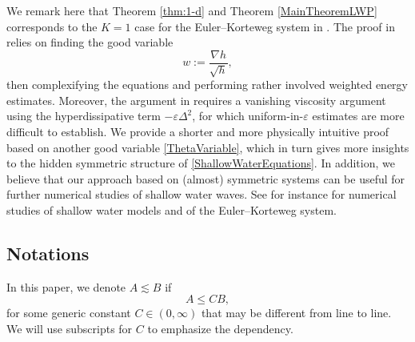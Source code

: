 \documentclass[reqno,11pt]{amsart}
\theoremstyle{plain}
\theoremstyle{definition}
\newtheorem{remark}[theorem]{Remark}
\numberwithin{equation}{section}
\begin{document}

    We remark here that Theorem \ref{thm:1-d} and Theorem \ref{MainTheoremLWP} corresponds to the $K=1$ case for the Euler--Korteweg system in \cite[Theorem 1.1]{BenzoniGavageDanchinDescombes3D}. The proof in \cite{BenzoniGavageDanchinDescombes3D} relies on finding the good variable 
    \[
    w:=\frac{\nabla h}{\sqrt{h}},
    \]
    then complexifying the equations and performing rather involved weighted energy estimates. Moreover, the argument in \cite{BenzoniGavageDanchinDescombes3D} requires a vanishing viscosity argument using the hyperdissipative term $-\varepsilon \Delta^2$, for which uniform-in-$\varepsilon$ estimates are more difficult to establish. We provide a shorter and more physically intuitive proof based on another good variable \eqref{ThetaVariable}, which in turn gives more insights to the hidden symmetric structure of \eqref{ShallowWaterEquations}. In addition, we believe that our approach based on (almost) symmetric systems can be useful for further numerical studies of shallow water waves. See for instance \cite{BreschEtAl,EiterGiesselmannLasarzikOffnerSauerborn,Guermond1, Guermond2,Guermond3,NobleVila,Xing,XingShu,XingZhangShu} for numerical studies of shallow water models and of the Euler--Korteweg system.


\subsection{Notations}
\label{Notations}
In this paper, we denote $A\lesssim B $ if
\[
A\leq CB,
\]
for some generic constant $C \in (0,\infty)$ that may be different from line to line. We will use subscripts for $ C $ to emphasize the dependency. \\
\end{document}
